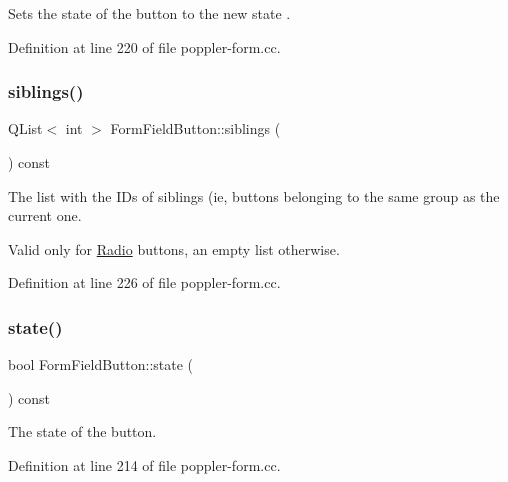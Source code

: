 Sets the state of the button to the new {\ttfamily state} . 

Definition at line 220 of file poppler-\/form.\+cc.

\mbox{\label{class_poppler_1_1_form_field_button_aa63cafeb2c342ebc80d37c8b631a7aac}} 
\subsubsection{\texorpdfstring{siblings()}{siblings()}}
{\footnotesize\ttfamily Q\+List$<$ int $>$ Form\+Field\+Button\+::siblings (\begin{DoxyParamCaption}{ }\end{DoxyParamCaption}) const}

The list with the I\+Ds of siblings (ie, buttons belonging to the same group as the current one.

Valid only for \hyperlink{class_poppler_1_1_form_field_button_acb50171e446769665a4c671c73385997a216190823ae210e968fc0f48a19aa897}{Radio} buttons, an empty list otherwise. 

Definition at line 226 of file poppler-\/form.\+cc.

\mbox{\label{class_poppler_1_1_form_field_button_ab5906ea323d8a407c8c66253ae280bab}} 
\subsubsection{\texorpdfstring{state()}{state()}}
{\footnotesize\ttfamily bool Form\+Field\+Button\+::state (\begin{DoxyParamCaption}{ }\end{DoxyParamCaption}) const}

The state of the button. 

Definition at line 214 of file poppler-\/form.\+cc.

\mbox{\label{class_poppler_1_1_form_field_button_a2f28ac2dc2ff3e77fac9d4b39a297aad}} 
